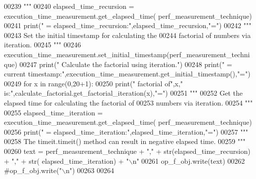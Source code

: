 \begin{DoxyCode}
00239 \textcolor{stringliteral}{                """}
00240                 elapsed\_time\_recursion = execution\_time\_measurement.get\_elapsed\_time(
      perf\_measurement\_technique)
00241                 print(\textcolor{stringliteral}{" = elapsed\_time\_recursion:"},elapsed\_time\_recursion,\textcolor{stringliteral}{"="})
00242                 \textcolor{stringliteral}{"""}
00243 \textcolor{stringliteral}{                    Set the initial timestamp for calculating the}
00244 \textcolor{stringliteral}{                        factorial of numbers via iteration.}
00245 \textcolor{stringliteral}{                """}
00246                 execution\_time\_measurement.set\_initial\_timestamp(perf\_measurement\_technique)
00247                 print(\textcolor{stringliteral}{" Calculate the factorial using iteration."})
00248                 print(\textcolor{stringliteral}{" = current timestamp:"},execution\_time\_measurement.get\_initial\_timestamp(),\textcolor{stringliteral}{"="})
00249                 \textcolor{keywordflow}{for} x \textcolor{keywordflow}{in} range(0,20+1):
00250                     print(\textcolor{stringliteral}{"     factorial of"},x,\textcolor{stringliteral}{" is:"},calculate\_factorial.get\_factorial\_iteration(x),\textcolor{stringliteral}{"="})
00251                 \textcolor{stringliteral}{"""}
00252 \textcolor{stringliteral}{                    Get the elapsed time for calculating the factorial of}
00253 \textcolor{stringliteral}{                        numbers via iteration.}
00254 \textcolor{stringliteral}{                """}
00255                 elapsed\_time\_iteration = execution\_time\_measurement.get\_elapsed\_time(
      perf\_measurement\_technique)
00256                 print(\textcolor{stringliteral}{" = elapsed\_time\_iteration:"},elapsed\_time\_iteration,\textcolor{stringliteral}{"="})
00257                 \textcolor{stringliteral}{"""}
00258 \textcolor{stringliteral}{                    The timeit.timeit() method can result in negative elapsed time.}
00259 \textcolor{stringliteral}{                """}
00260                 text = perf\_measurement\_technique + \textcolor{stringliteral}{","} + str(elapsed\_time\_recursion) + \textcolor{stringliteral}{","} + str(
      elapsed\_time\_iteration) + \textcolor{stringliteral}{"\(\backslash\)n"}
00261                 op\_f\_obj.write(text)
00262                 \textcolor{comment}{#op\_f\_obj.write("\(\backslash\)n")}
00263 
00264 
\end{DoxyCode}
\hypertarget{classutilities_1_1timing__measurements_1_1performance__measurement__no__ns_1_1execution__time__measurement_a465918aa8dcf663887149cbf9a7306b9}{}
